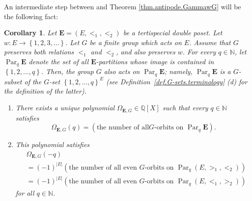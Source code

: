 \documentclass[12pt]{article}
\theoremstyle{plain}
\newtheorem{corollary}[theorem]{Corollary}
\theoremstyle{definition}
\theoremstyle{remark}
\newcommand{\Par}{\operatorname{Par}}
\newcommand{\EE}{{\mathbf{E}}}
\newcommand{\NN}{{\mathbb{N}}}
\begin{document}
An intermediate step between \cite[Theorem 2.13]{Joch} and Theorem
\ref{thm.antipode.GammawG} will be the following fact:

\begin{corollary}
\label{cor.reciprocity.GammawG}Let $ \EE =\left(  E,<_{1},<_{2}\right)
$ be a tertispecial double poset. Let \newline
$w:E\rightarrow\left\{  1,2,3,\ldots
\right\}  $. Let $G$ be a finite group which acts on $E$. Assume that $G$
preserves both relations $<_{1}$ and $<_{2}$, and also preserves $w$. For
every $q\in \NN $, let $\Par_q \EE$
denote the set of all $\EE$-partitions whose image is contained in
$\left\{  1,2,\ldots,q\right\}  $. Then, the group $G$ also acts on
$\Par_q \EE$; namely,
$\Par_q \EE$ is a $G$-subset of the $G$-set $\left\{  1,2,\ldots
,q\right\}  ^{E}$ (see Definition~\ref{def.G-sets.terminology} (d) for the
definition of the latter).

\begin{enumerate}
\item[(a)] There exists a unique polynomial $\Omega_{\EE, G}
\in\mathbb{Q}\left[  X\right]  $ such that every $q\in \NN $ satisfies%
\begin{equation}
\Omega_{\EE, G}\left(  q\right)  =\left(  \text{the number of all
}G\text{-orbits on } \Par_q \EE \right)  .
\label{eq.cor.reciprocity.GammawG.a.def}
\end{equation}


\item[(b)] This polynomial satisfies%
\begin{align}
&  \Omega_{\EE,G}\left(  -q\right) \nonumber\\
&  =\left(  -1\right)  ^{\left\vert E\right\vert }\left(  \text{the number of
all even }G\text{-orbits on } \Par_q \left(
E,>_{1},<_{2}\right)  \right) \nonumber\\
&  =\left(  -1\right)  ^{\left\vert E\right\vert }\left(  \text{the number of
all even }G\text{-orbits on } \Par_q \left(
E,<_{1},>_{2}\right)  \right)
\label{eq.cor.reciprocity.GammawG.b.2}
\end{align}
for all $q\in \NN $.
\end{enumerate}
\end{corollary}
\end{document}
